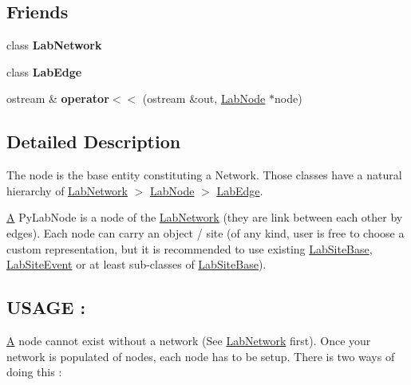 \subsection*{Friends}
\begin{DoxyCompactItemize}
\item 
\hypertarget{classelps_1_1_lab_node_a0a1eacd7b0485858d6720402ab709808}{class {\bfseries Lab\+Network}}\label{classelps_1_1_lab_node_a0a1eacd7b0485858d6720402ab709808}

\item 
\hypertarget{classelps_1_1_lab_node_a046f6907a306a9e8f90bc4e7bb2a9a4b}{class {\bfseries Lab\+Edge}}\label{classelps_1_1_lab_node_a046f6907a306a9e8f90bc4e7bb2a9a4b}

\item 
\hypertarget{classelps_1_1_lab_node_afc8c125be88edcef6425f206bd7d9b8c}{ostream \& {\bfseries operator$<$$<$} (ostream \&out, \hyperlink{classelps_1_1_lab_node}{Lab\+Node} $\ast$node)}\label{classelps_1_1_lab_node_afc8c125be88edcef6425f206bd7d9b8c}

\end{DoxyCompactItemize}


\subsection{Detailed Description}
The node is the base entity constituting a Network. Those classes have a natural hierarchy of \hyperlink{classelps_1_1_lab_network}{Lab\+Network} $>$ \hyperlink{classelps_1_1_lab_node}{Lab\+Node} $>$ \hyperlink{classelps_1_1_lab_edge}{Lab\+Edge}.

\hyperlink{class_a}{A} Py\+Lab\+Node is a node of the \hyperlink{classelps_1_1_lab_network}{Lab\+Network} (they are link between each other by edges). Each node can carry an object / site (of any kind, user is free to choose a custom representation, but it is recommended to use existing \hyperlink{classelps_1_1_lab_site_base}{Lab\+Site\+Base}, \hyperlink{classelps_1_1_lab_site_event}{Lab\+Site\+Event} or at least sub-\/classes of \hyperlink{classelps_1_1_lab_site_base}{Lab\+Site\+Base}).

\subsection*{U\+S\+A\+G\+E \+: }

\hyperlink{class_a}{A} node cannot exist without a network (See \hyperlink{classelps_1_1_lab_network}{Lab\+Network} first). Once your network is populated of nodes, each node has to be setup. There is two ways of doing this \+:

